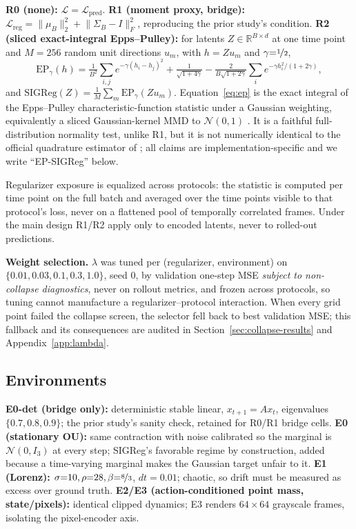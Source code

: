 \documentclass{article}
\begin{document}
\textbf{R0 (none):} $\mathcal{L}=\mathcal{L}_{\text{pred}}$.
\textbf{R1 (moment proxy, bridge):} $\mathcal{L}_{\text{reg}}=\lVert\mu_B\rVert_2^2+\lVert\Sigma_B-I\rVert_F^2$, reproducing the prior study's condition.
\textbf{R2 (sliced exact-integral Epps--Pulley):} for latents $Z\in\mathbb{R}^{B\times d}$ at one time point and $M{=}256$ random unit directions $u_m$, with $h=Zu_m$ and $\gamma{=}\nicefrac12$,
\begin{equation}
\label{eq:ep}
\mathrm{EP}_\gamma(h)=\tfrac{1}{B^2}\textstyle\sum_{i,j}e^{-\gamma(h_i-h_j)^2}+\tfrac{1}{\sqrt{1+4\gamma}}-\tfrac{2}{B\sqrt{1+2\gamma}}\textstyle\sum_i e^{-\gamma h_i^2/(1+2\gamma)},
\end{equation}
and $\mathrm{SIGReg}(Z)=\frac1M\sum_m \mathrm{EP}_\gamma(Zu_m)$. Equation~\eqref{eq:ep} is the exact integral of the Epps--Pulley characteristic-function statistic under a Gaussian weighting, equivalently a sliced Gaussian-kernel MMD to $\mathcal{N}(0,1)$ \citep{zimmermann2025kerjepa}. It is a faithful full-distribution normality test, unlike R1, but it is not numerically identical to the official quadrature estimator of \citet{balestriero2025lejepa}; all claims are implementation-specific and we write ``EP-SIGReg'' below.

Regularizer exposure is equalized across protocols: the statistic is computed per time point on the full batch and averaged over the time points visible to that protocol's loss, never on a flattened pool of temporally correlated frames. Under the main design R1/R2 apply only to encoded latents, never to rolled-out predictions.

\textbf{Weight selection.} $\lambda$ was tuned per (regularizer, environment) on $\{0.01,0.03,0.1,0.3,1.0\}$, seed 0, by validation one-step MSE \emph{subject to non-collapse diagnostics}, never on rollout metrics, and frozen across protocols, so tuning cannot manufacture a regularizer--protocol interaction. When every grid point failed the collapse screen, the selector fell back to best validation MSE; this fallback and its consequences are audited in Section~\ref{sec:collapse-results} and Appendix~\ref{app:lambda}.

\subsection{Environments}
\label{sec:envs}

\textbf{E0-det (bridge only):} deterministic stable linear, $x_{t+1}=Ax_t$, eigenvalues $\{0.7,0.8,0.9\}$; the prior study's sanity check, retained for R0/R1 bridge cells.
\textbf{E0 (stationary OU):} same contraction with noise calibrated so the marginal is $\mathcal{N}(0,I_3)$ at every step; SIGReg's favorable regime by construction, added because a time-varying marginal makes the Gaussian target unfair to it.
\textbf{E1 (Lorenz):} $\sigma{=}10,\rho{=}28,\beta{=}\nicefrac83$, $dt{=}0.01$; chaotic, so drift must be measured as excess over ground truth.
\textbf{E2/E3 (action-conditioned point mass, state/pixels):} identical clipped dynamics; E3 renders $64{\times}64$ grayscale frames, isolating the pixel-encoder axis.
\end{document}
